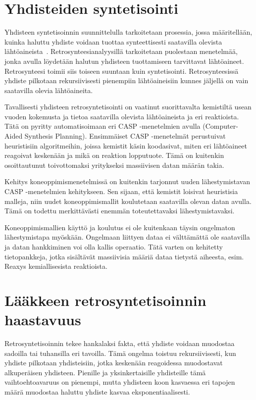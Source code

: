 \documentclass[finnish,twoside,censored,tkt,sw-line]{HYthesisML}
\begin{document}
\section{Yhdisteiden syntetisointi}

Yhdisteen syntetisoinnin suunnittelulla tarkoitetaan prosessia, jossa määritellään, kuinka haluttu yhdiste voidaan tuottaa synteettisesti saatavilla olevista lähtöaineista~\cite{ColeyConnorW2018MLiC}.
Retrosynteesianalyysillä tarkoitetaan puolestaan menetelmää, jonka avulla löydetään halutun yhdisteen tuottamiseen tarvittavat lähtöaineet.
Retrosynteesi toimii siis toiseen suuntaan kuin syntetisointi.
Retrosynteesissä yhdiste pilkotaan rekursiivisesti pienempiin lähtöaineisiin kunnes jäljellä on vain saatavilla olevia lähtöaineita.

Tavallisesti yhdisteen retrosyntetisointi on vaatinut suorittavalta kemistiltä usean vuoden kokemusta ja tietoa saatavilla olevista lähtöaineista ja eri reaktioista.
Tätä on pyritty automatisoimaan eri CASP -menetelmien avulla (Computer-Aided Synthesis Planning).
Ensimmäiset CASP -menetelmät perustuivat heuristisiin algoritmeihin, joissa kemistit käsin koodasivat, miten eri lähtöaineet reagoivat keskenään ja mikä on reaktion lopputuote.
Tämä on kuitenkin osoittautunut toivottomaksi yritykseksi massiivisen datan määrän takia.

Kehitys koneoppimismenetelmissä on kuitenkin tarjonnut uuden lähestymistavan CASP -menetelmien kehitykseen.
Sen sijaan, että kemistit loisivat heuristisia malleja, niin uudet koneoppimismallit koulutetaan saatavilla olevan datan avulla.
Tämä on todettu merkittävästi enemmän toteutettavaksi lähestymistavaksi.

Koneoppimismallien käyttö ja koulutus ei ole kuitenkaan täysin ongelmaton lähestymistapa myöskään.
Ongelmaan liittyen dataa ei välttämättä ole saatavilla ja datan hankkiminen voi olla kallis operaatio.
Tätä varten on kehitetty tietopankkeja, jotka sisältävät massiivisia määriä dataa tietystä aiheesta, esim. Reaxys kemiallisesista reaktioista.


\section{Lääkkeen retrosyntetisoinnin haastavuus}

Retrosyntetisoinnin tekee hankalaksi fakta, että yhdiste voidaan muodostaa sadoilla tai tuhansilla eri tavoilla.
Tämä ongelma toistuu rekursiivisesti, kun yhdiste pilkotaan yhdisteisiin, jotka keskenään reagoidessa muodostavat alkuperäisen yhdisteen.
Pienille ja yksinkertaisille yhdisteille tämä vaihtoehtoavaruus on pienempi, mutta yhdisteen koon kasvaessa eri tapojen määrä muodostaa haluttu yhdiste kasvaa eksponentiaalisesti.
\end{document}

